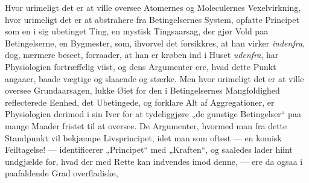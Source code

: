 \documentclass[12pt,a4paper]{book}
\begin{document}
Hvor urimeligt det er at ville oversee Atomernes og Moleculernes
Vexelvirkning, hvor urimeligt det er at abstrahere fra Betingelsernes
System, opfatte Principet som en i sig ubetinget Ting, en mystisk
Tingsaarsag, der gjør Vold paa Betingelserne, en Bygmester, som, ihvorvel
det forsikkres, at han virker \emph{indenfra}, dog, nærmere beseet, forraader,
at han er krøben ind i Huset \emph{udenfra}, har Physiologien fortræffelig
viist, og dens Argumenter ere, hvad dette Punkt angaaer, baade vægtige og
slaaende og stærke. Men hvor urimeligt det er at ville oversee
Grundaarsagen, lukke Øiet for den i Betingelsernes Mangfoldighed
reflecterede Eenhed, det Ubetingede, og forklare Alt af Aggregationer, er
Physiologien derimod i sin Iver for at tydeliggjøre „de gunstige
Betingelser“ paa mange Maader fristet til at oversee. De Argumenter,
hvormed man fra dette Standpunkt vil bekjæmpe Livsprincipet, idet man som
oftest --- en komisk Feiltagelse! --- identificerer „Principet“ med
„Kraften“, og saaledes lader hiint undgjælde for, hvad der med Rette kan
indvendes imod denne, --- ere da ogsaa i paafaldende Grad overfladiske,
\end{document}
